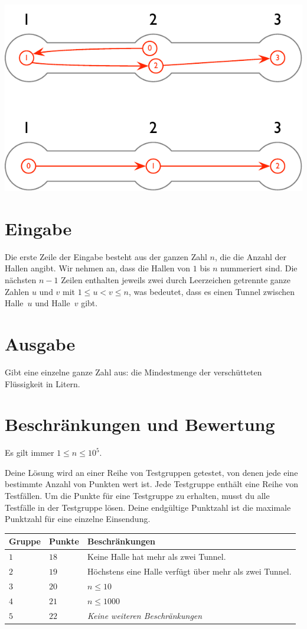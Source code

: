 \includegraphics[width=.4\textwidth]{img/sample-1-ans.pdf}

\section*{Eingabe}

Die erste Zeile der Eingabe besteht aus der ganzen Zahl $n$, die die Anzahl der Hallen angibt.
Wir nehmen an, dass die Hallen von $1$ bis $n$ nummeriert sind.
Die nächsten $n-1$ Zeilen enthalten jeweils zwei durch Leerzeichen getrennte ganze Zahlen $u$ und $v$ mit 
$1\leq u < v \leq n$, %
was bedeutet, dass es einen Tunnel zwischen Halle~$u$ und Halle~$v$ gibt.

\section*{Ausgabe}

Gibt eine einzelne ganze Zahl aus: die Mindestmenge der verschütteten Flüssigkeit in Litern.

\section*{Beschränkungen und Bewertung}

Es gilt immer
$1\leq n\leq 10^5$. %

Deine Lösung wird an einer Reihe von Testgruppen getestet, von denen jede eine bestimmte Anzahl von Punkten wert ist.
Jede Testgruppe enthält eine Reihe von Testfällen.
Um die Punkte für eine Testgruppe zu erhalten, musst du alle Testfälle in der Testgruppe lösen.
Deine endgültige Punktzahl ist die maximale Punktzahl für eine einzelne Einsendung.

\medskip
\begin{tabular}{lll}
Gruppe & Punkte & Beschränkungen \\\hline
  $1$ & $18$ & Keine Halle hat mehr als zwei Tunnel.\\
  $2$ & $19$ & Höchstens eine Halle verfügt über mehr als zwei Tunnel.\\
  $3$ & $20$ & $n\leq 10$\\
  $4$ & $21$ & $n\leq 1000$\\
  $5$ & $22$ & \emph{Keine weiteren Beschränkungen}
\end{tabular}
